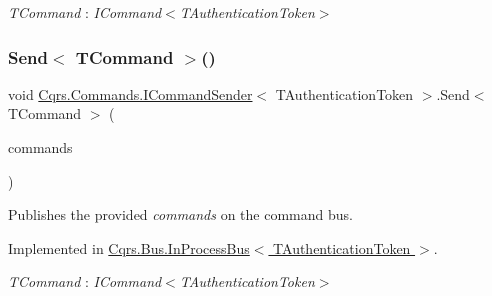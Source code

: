 \begin{Desc}
\item[Type Constraints]\begin{description}
\item[{\em T\+Command} : {\em I\+Command$<$T\+Authentication\+Token$>$}]\end{description}
\end{Desc}
\mbox{\label{interfaceCqrs_1_1Commands_1_1ICommandSender_a3fb3ec40a3e862f721a7c9204e67e832_a3fb3ec40a3e862f721a7c9204e67e832}} 
\subsubsection{\texorpdfstring{Send$<$ T\+Command $>$()}{Send< TCommand >()}\hspace{0.1cm}{\footnotesize\ttfamily [2/2]}}
{\footnotesize\ttfamily void \hyperlink{interfaceCqrs_1_1Commands_1_1ICommandSender}{Cqrs.\+Commands.\+I\+Command\+Sender}$<$ T\+Authentication\+Token $>$.Send$<$ T\+Command $>$ (\begin{DoxyParamCaption}\item[{I\+Enumerable$<$ T\+Command $>$}]{commands }\end{DoxyParamCaption})}



Publishes the provided {\itshape commands}  on the command bus. 



Implemented in \hyperlink{classCqrs_1_1Bus_1_1InProcessBus_ae5dae5f2445387280c974ec181167055_ae5dae5f2445387280c974ec181167055}{Cqrs.\+Bus.\+In\+Process\+Bus$<$ T\+Authentication\+Token $>$}.

\begin{Desc}
\item[Type Constraints]\begin{description}
\item[{\em T\+Command} : {\em I\+Command$<$T\+Authentication\+Token$>$}]\end{description}
\end{Desc}

